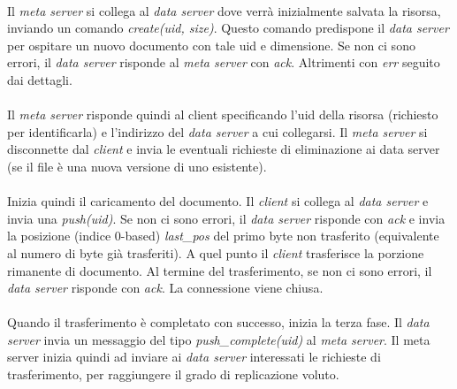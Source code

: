 \documentclass{article}
\begin{document}
\paragraph{} Il \emph{meta server} si collega al \emph{data server} dove verrà inizialmente salvata la risorsa, inviando un comando \emph{create(uid, size)}. Questo comando predispone il \emph{data server} per ospitare un nuovo documento con tale uid e dimensione. Se non ci sono errori, il \emph{data server} risponde al \emph{meta server} con \emph{ack}. Altrimenti con \emph{err} seguito dai dettagli.

\paragraph{} Il \emph{meta server} risponde quindi al client specificando l'uid della risorsa (richiesto per identificarla) e l'indirizzo del \emph{data server} a cui collegarsi. Il \emph{meta server} si disconnette dal \emph{client} e invia le eventuali richieste di eliminazione ai data server (se il file è una nuova versione di uno esistente).

\paragraph{} Inizia quindi il caricamento del documento. Il \emph{client} si collega al \emph{data server} e invia una \emph{push(uid)}. Se non ci sono errori, il \emph{data server} risponde con \emph{ack} e invia la posizione (indice 0-based) \emph{last\_pos} del primo byte non trasferito (equivalente al numero di byte già trasferiti). A quel punto il \emph{client} trasferisce la porzione rimanente di documento. Al termine del trasferimento, se non ci sono errori, il \emph{data server} risponde con \emph{ack}. La connessione viene chiusa.

\paragraph{} Quando il trasferimento è completato con successo, inizia la terza fase. Il \emph{data server} invia un messaggio del tipo \emph{push\_complete(uid)} al \emph{meta server}. Il meta server inizia quindi ad inviare ai \emph{data server} interessati le richieste di trasferimento, per raggiungere il grado di replicazione voluto.
\end{document}
